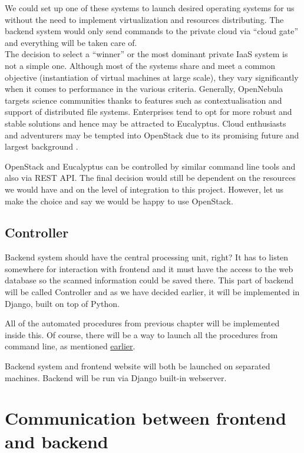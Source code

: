 \documentclass[thesis=B,english]{FITthesis}[2013/04/26]
\begin{document}
We could set up one of these systems to launch desired operating systems for us without the need to implement virtualization and resources distributing. The backend system would only send commands to the private cloud via ``cloud gate'' and everything will be taken care of. \\

The decision to select a ``winner'' or the most dominant private IaaS system is not a simple one. Although most of the systems share and meet a common objective (instantiation of virtual machines at large scale), they vary significantly when it comes to performance in the various criteria. Generally, OpenNebula targets science communities thanks to features such as contextualisation and support of distributed file systems. Enterprises tend to opt for more robust and stable solutions and hence may be attracted to Eucalyptus. Cloud enthusiasts and adventurers may be tempted into OpenStack due to its promising future and largest background \cite{klepac}.

OpenStack and Eucalyptus can be controlled by similar command line tools and also via REST API. The final decision would still be dependent on the resources we would have and on the level of integration to this project. However, let us make the choice and say we would be happy to use OpenStack.

\subsection{Controller}

Backend system should have the central processing unit, right? It has to listen somewhere for interaction with frontend and it must have the access to the web database so the scanned information could be saved there. This part of backend will be called Controller and as we have decided earlier, it will be implemented in Django, built on top of Python.

All of the automated procedures from previous chapter will be implemented inside this. Of course, there will be a way to launch all the procedures from command line, as mentioned \hyperref[TODO]{earlier}.

Backend system and frontend website will both be launched on separated machines. Backend will be run via Django built-in webserver.

\section{Communication between frontend and backend}
\end{document}
